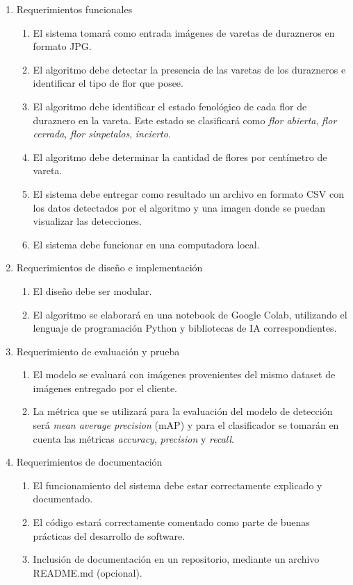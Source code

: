 \begin{enumerate}
	\item Requerimientos funcionales
		\begin{enumerate}
			\item El sistema tomará como entrada imágenes de varetas de durazneros en formato JPG.			
			\item El algoritmo debe detectar la presencia de las varetas de los durazneros e identificar el tipo de flor que posee.			        
			\item El algoritmo debe identificar el estado fenológico de cada flor de duraznero en la vareta. Este estado se clasificará como  \textit{flor abierta}, \textit{flor cerrada}, \textit{flor sinpetalos}, \textit{incierto}.
			\item El algoritmo debe determinar la cantidad de flores por centímetro de vareta.
			\item El sistema debe entregar como resultado un archivo en formato CSV con los datos detectados por el algoritmo y una imagen donde se puedan visualizar las detecciones.
			\item El sistema debe funcionar en una computadora local.
		\end{enumerate}
	\item Requerimientos de diseño e implementación
		\begin{enumerate}
			\item El diseño debe ser modular.
			\item El algoritmo se elaborará en una notebook de Google Colab, utilizando el lenguaje de  programación Python y bibliotecas de IA correspondientes. 
		\end{enumerate}
	\item Requerimiento de evaluación y prueba
	\begin{enumerate}
			\item El modelo se evaluará con imágenes provenientes del mismo dataset de imágenes entregado por el cliente.
			 \item La métrica que se utilizará para la evaluación del modelo de detección será \textit{mean average precision} (mAP) y para el clasificador se tomarán en cuenta las métricas \textit{accuracy}, \textit{precision} y \textit{recall}.
		\end{enumerate}
	\item Requerimientos de documentación
	\begin{enumerate}
			\item El funcionamiento del sistema debe estar correctamente explicado y documentado.
			 \item El código estará correctamente comentado como parte de buenas prácticas del desarrollo de software.
			 \item Inclusión de documentación en un repositorio, mediante un archivo README.md (opcional).
		\end{enumerate}
\end{enumerate}

